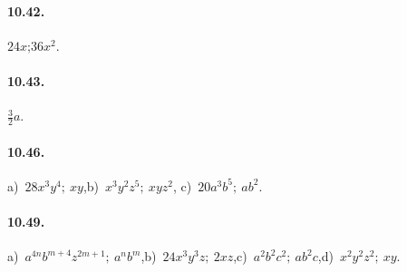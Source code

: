 \paragraph{10.42.} $24x$;\:$36x^2$.

\paragraph{10.43.} $\frac{3}{2}a$.

\paragraph{10.46.} a)~$28x^{3}y^{4};\:xy$,\quad b)~$x^{3}y^{2}z^{5};\:xyz^{2}$, \quad c)~$20a^{3}b^{5};\:ab^{2}$.

\paragraph{10.49.} a)~$a^{4n}b^{m+4}z^{2m+1};\:a^{n}b^{m}$,\quad b)~$24x^{3}y^{3}z;\:2xz$,\quad c)~$a^{2}b^{2}c^{2};\:ab^{2}c$,\quad d)~$x^{2}y^{2}z^{2};\:xy$.
